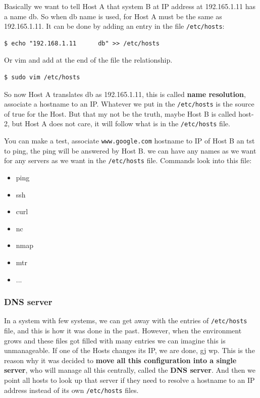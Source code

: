 \documentclass{article}
\newenvironment{codetemplate}[1][]{%
  \mybasecolorbox[#1]
  \itshape
}{%
  \endmybasecolorbox
}
\begin{document}
Basically we want to tell Host A that system B at IP address at 192.165.1.11 has a name db. So when db name is used, for Host A must be the same as 192.165.1.11. It can be done by adding an entry in the file \verb|/etc/hosts|:

\begin{codetemplate}{}
\begin{verbatim}
$ echo "192.168.1.11      db" >> /etc/hosts
\end{verbatim}
\end{codetemplate}

Or vim and add at the end of the file the relationship.
\begin{codetemplate}{}
\begin{verbatim}
$ sudo vim /etc/hosts
\end{verbatim}
\end{codetemplate}

So now Host A translates db as 192.165.1.11, this is called \textbf{name resolution}, associate a hostname to an IP. Whatever we put in the \verb|/etc/hosts| is the source of true for the Host. But that my not be the truth, maybe Host B is called host-2, but Host A does not care, it will follow what is in the \verb|/etc/hosts| file. 

You can make a test, associate \verb|www.google.com| hostname to IP of Host B an tst to ping, the ping will be answered by Host B. we can have any names as we want for any servers as we want in the \verb|/etc/hosts| file. Commands look into this file:

\begin{itemize}
    \item ping
    \item ssh
    \item curl
    \item nc
    \item nmap
    \item mtr
    \item ...
\end{itemize}

\subsubsection{DNS server}

In a system with few systems, we can get away with the entries of \verb|/etc/hosts| file, and this is how it was done in the past. However, when the environment grows and these files got filled with many entries we can imagine this is unmanageable. If one of the Hosts changes its IP, we are done, gj wp. This is the reason why it was decided to \textbf{move all this configuration into a single server}, who will manage all this centrally, called the \textbf{DNS server}. And then we point all hosts to look up that server if they need to resolve a hostname to an IP address instead of its own \verb|/etc/hosts| files.
\end{document}
